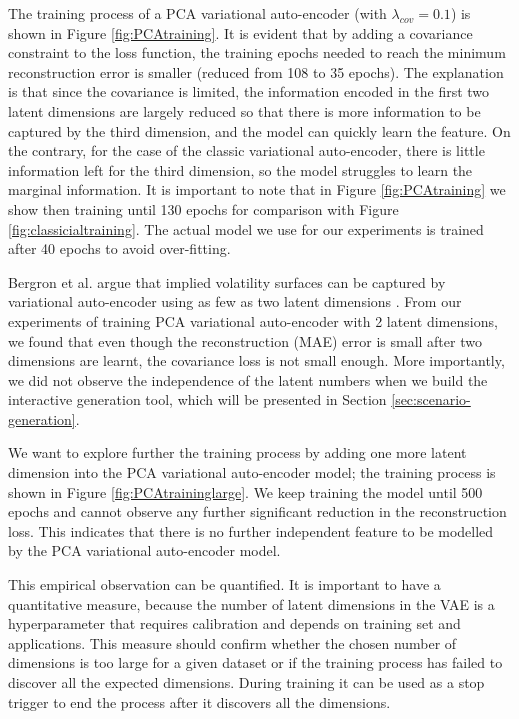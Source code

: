 \documentclass[format=sigconf]{acmart}
\begin{document}
The training process of a PCA variational auto-encoder (with $\lambda_{cov} = 0.1$) is shown in Figure \ref{fig:PCAtraining}. It is evident that by adding a covariance constraint to the loss function, the training epochs needed to reach the minimum reconstruction error is smaller (reduced from 108 to 35 epochs). The explanation is that since the covariance is limited, the information encoded in the first two latent dimensions are largely reduced so that there is more information to be captured by the third dimension, and the model can quickly learn the feature. On the contrary, for the case of the classic variational auto-encoder, there is little information left for the third dimension, so the model struggles to learn the marginal information. It is important to note that in Figure \ref{fig:PCAtraining} we show then training until 130 epochs for comparison with Figure \ref{fig:classicialtraining}. The actual model we use for our experiments is trained after 40 epochs to avoid over-fitting.

Bergron et al. argue that implied volatility surfaces can be captured by variational auto-encoder using as few as two latent dimensions \cite{bergeron2022variational}. From our experiments of training PCA variational auto-encoder with 2 latent dimensions, we found that even though the reconstruction (MAE) error is small after two dimensions are learnt, the covariance loss is not small enough. More importantly, we did not observe the independence of the latent numbers when we build the interactive generation tool, which will be presented in Section \ref{sec:scenario-generation}.  

We want to explore further the training process by adding one more latent dimension into the PCA variational auto-encoder model; the training process is shown in Figure \ref{fig:PCAtraininglarge}. We keep training the model until 500 epochs and cannot observe any further significant reduction in the reconstruction loss. This indicates that there is no further independent feature to be modelled by the PCA variational auto-encoder model.


This empirical observation can be quantified. It is important to have a quantitative measure, because the number of latent dimensions in the VAE is a hyperparameter that requires calibration and depends on training set and applications. This measure should confirm whether the chosen number of dimensions is too large for a given dataset or if the training process has failed to discover all the expected dimensions. During training it can be used as a stop trigger to end the process after it discovers all the dimensions.
\end{document}
